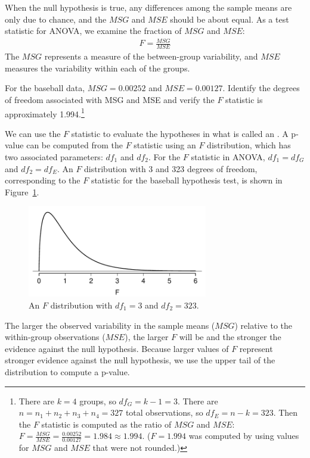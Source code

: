 When the null hypothesis is true, any differences among the sample means are only due to chance, and the $MSG$ and $MSE$ should be about equal. As a test statistic for ANOVA, we examine the fraction of $MSG$ and $MSE$:
\begin{align} \label{formulaForTheFStatistic}
F = \frac{MSG}{MSE}
\end{align}
The $MSG$ represents a measure of the between-group variability, and $MSE$ measures the variability within each of the groups.

\begin{exercise}
For the baseball data, $MSG = 0.00252$ and $MSE=0.00127$. Identify the degrees of freedom associated with MSG and MSE and verify the $F$ statistic is approximately 1.994.\footnote{There are $k=4$ groups, so $df_{G} = k-1 = 3$. There are $n = n_1 + n_2 + n_3 + n_4 = 327$ total observations, so $df_{E} = n - k = 323$. Then the $F$ statistic is computed as the ratio of $MSG$ and $MSE$: $F = \frac{MSG}{MSE} = \frac{0.00252}{0.00127} = 1.984 \approx 1.994$. ($F=1.994$ was computed by using values for $MSG$ and $MSE$ that were not rounded.)}
\end{exercise}

We can use the $F$ statistic to evaluate the hypotheses in what is called an . A p-value can be computed from the $F$ statistic using an $F$ distribution, which has two associated parameters: $df_{1}$ and $df_{2}$. For the $F$ statistic in ANOVA, $df_{1} = df_{G}$ and $df_{2}= df_{E}$. An $F$ distribution with 3 and 323 degrees of freedom, corresponding to the $F$ statistic for the baseball hypothesis test, is shown in Figure~\ref{fDist3And323}.

\begin{figure}[ht]
\centering
\includegraphics[width=0.7\textwidth]{ch_inference_for_means/figures/fDist3And323/fDist3And323}
\caption{An $F$ distribution with $df_1=3$ and $df_2=323$.}
\label{fDist3And323}
\end{figure}

The larger the observed variability in the sample means ($MSG$) relative to the within-group observations ($MSE$), the larger $F$ will be and the stronger the evidence against the null hypothesis. Because larger values of $F$ represent stronger evidence against the null hypothesis, we use the upper tail of the distribution to compute a p-value.

